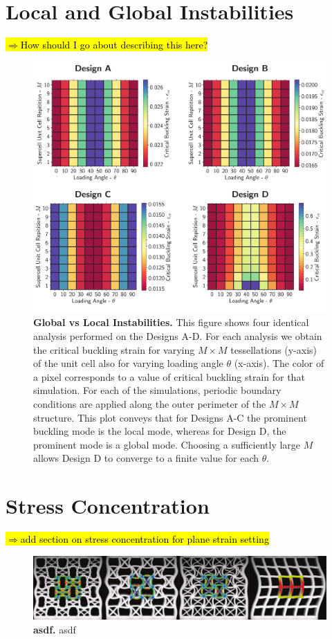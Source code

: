 \documentclass[10pt,twoside]{fernandes_supp}
\newcommand{\mf}[1]{\noindent\color{color2}\sethlcolor{cyan}\hl{$\Longrightarrow$#1}\normalcolor}
\begin{document}
\section{Local and Global Instabilities}
\mf{How should I go about describing this here?}
\begin{figure}
	\centering
	\includegraphics[width=0.7\linewidth]{SFig12.pdf}
	\caption{{\bf Global vs Local Instabilities.} This figure shows four identical analysis performed on the Designs A-D. For each analysis we obtain the critical buckling strain for varying $M\times M$ tessellations (y-axis) of the unit cell also for varying loading angle $\theta$ (x-axis). The color of a pixel corresponds to a value of critical buckling strain for that simulation. For each of the simulations, periodic boundary conditions are applied along the outer perimeter of the $M\times M$ structure. This plot conveys that for Designs A-C the prominent buckling mode is the local mode, whereas for Design D, the prominent mode is a global mode. Choosing a sufficiently large $M$ allows Design D to converge to a finite value for each $\theta$.}
	\label{DomainSize}
\end{figure}

\section{Stress Concentration}
\mf{add section on stress concentration for plane strain setting}


%
% 


\begin{figure}
	\centering
	\includegraphics[width=0.9\linewidth]{SFig13.pdf}
	\caption{{\bf asdf.} asdf}
	\label{asdfa}
\end{figure}
\end{document}
